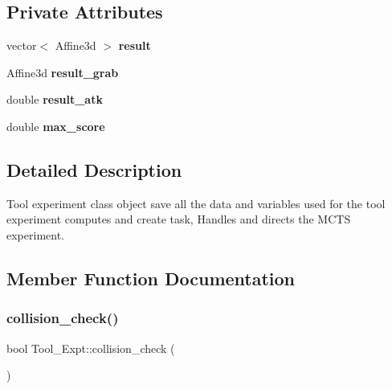 \subsection*{Private Attributes}
\begin{DoxyCompactItemize}
\item 
\mbox{\label{classTool__Expt_ac6b5619c61756f3f3749649603a8ce87}} 
vector$<$ Affine3d $>$ {\bfseries result}
\item 
\mbox{\label{classTool__Expt_a11ce5889eb57760312df22b12964b69e}} 
Affine3d {\bfseries result\+\_\+grab}
\item 
\mbox{\label{classTool__Expt_a0d5edb8882f8313a4e3ac4e00399c671}} 
double {\bfseries result\+\_\+atk}
\item 
\mbox{\label{classTool__Expt_a1c722dcf3fe2539d6c79f1c0cd364bc1}} 
double {\bfseries max\+\_\+score}
\end{DoxyCompactItemize}


\subsection{Detailed Description}
Tool experiment class object save all the data and variables used for the tool experiment computes and create task, Handles and directs the M\+C\+TS experiment. 

\subsection{Member Function Documentation}
\mbox{\label{classTool__Expt_a35d5f7c664b44e813c3e1777b723d651}} 
\subsubsection{\texorpdfstring{collision\+\_\+check()}{collision\_check()}}
{\footnotesize\ttfamily bool Tool\+\_\+\+Expt\+::collision\+\_\+check (\begin{DoxyParamCaption}{ }\end{DoxyParamCaption})}



